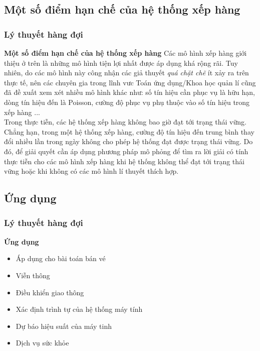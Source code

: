 \documentclass[10pt]{beamer}
\begin{document}
\subsection{Một số điểm hạn chế của hệ thống xếp hàng}
\begin{frame}
\frametitle{Lý thuyết hàng đợi}
\begin{block}{\textbf{Một số điểm hạn chế của hệ thống xếp hàng}}
Các mô hình xếp hàng giới thiệu ở trên là những mô hình tiện lợi nhất
được áp dụng khá rộng rãi. Tuy nhiên, do các mô hình này công nhận các
giả thuyết \textit{quá chặt chẽ} ít xảy ra trên thực tế, nên các chuyên gia trong
lĩnh vưc Toán ứng dụng/Khoa học quản lí cũng đã đề xuất
xem xét nhiều mô hình khác như: số
tín hiệu cần phục vụ là hữu hạn, dòng tín hiệu đến là Poisson, cường độ
phục vụ phụ thuộc vào số tín hiệu trong xếp hàng ... \\
Trong thực tiễn, các hệ thống xếp hàng không bao giờ đạt
tới trạng thái vững. Chẳng hạn, trong một hệ thống xếp hàng, cường
độ tín hiệu đến trung bình thay đổi nhiều lần trong ngày không cho phép
hệ thống đạt được trạng thái vững.
Do đó, để giải quyết cần áp dụng phương pháp mô phỏng để tìm ra lời giải có tính thực tiễn cho các mô hình xếp hàng khi hệ thống
không thể đạt tới trạng thái vững hoặc khi không có các mô hình lí thuyết
thích hợp.
\end{block}
\end{frame}
\subsection{Ứng dụng}
\begin{frame}
\frametitle{Lý thuyết hàng đợi}
\begin{block}{\textbf{Ứng dụng}}
\begin{itemize}
    \item Áp dụng cho bài toán bán vé
    \item Viễn thông
    \item Điều khiển giao thông
    \item Xác định trình tự của hệ thống máy tính
    \item Dự báo hiệu suất của máy tinh
    \item Dịch vụ sức khỏe
\end{itemize}
\end{block}
\end{frame}
\end{document}

